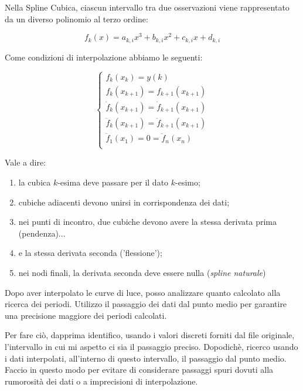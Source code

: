 \documentclass{article}
\begin{document}
Nella Spline Cubica, ciascun intervallo tra due osservazioni viene
rappresentato da un diverso polinomio al terzo ordine:

\begin{equation}
  f_k(x) = a_{k,i} x^3 + b_{k,i} x^2 + c_{k,i} x + d_{k,i}
\end{equation}

Come condizioni di interpolazione abbiamo le seguenti:

\begin{equation}
  \begin{cases}
    f_k(x_k) = y(k) \\
    f_{k} (x_{k+1}) = f_{k+1} (x_{k+1}) \\
    \dot f_{k} (x_{k+1}) = \dot f_{k+1} (x_{k+1} )  \\
    \ddot f_{k} (x_{k+1}) = \ddot f_{k+1} (x_{k+1} ) \\
    \ddot f_1(x_1) = 0 = \ddot f_n(x_n) \\
  \end{cases}
\end{equation}

Vale a dire:
\begin{enumerate}
\item la cubica $k$-esima deve passare per il dato $k$-esimo; \\
\item cubiche adiacenti devono unirsi in corrispondenza dei dati; \\
\item nei punti di incontro, due cubiche devono avere la stessa
  derivata prima (pendenza)... \\
\item e la stessa derivata seconda ('flessione');
\item nei nodi finali, la derivata seconda deve essere nulla
  (\emph{spline naturale})
\end{enumerate}

Dopo aver interpolato le curve di luce, posso analizzare quanto
calcolato alla ricerca dei periodi. Utilizzo il passaggio dei dati dal
punto medio per garantire una precisione maggiore dei periodi
calcolati.

Per fare ciò, dapprima identifico, usando i valori discreti forniti dal file originale, l'intervallo in
cui mi aspetto ci sia il passaggio preciso. Dopodichè, ricerco
usando i dati interpolati, all'interno di questo intervallo, il
passaggio dal punto medio.
Faccio in questo modo per evitare di
considerare passaggi spuri dovuti alla rumorosità dei dati o a
imprecisioni di interpolazione.
\end{document}
